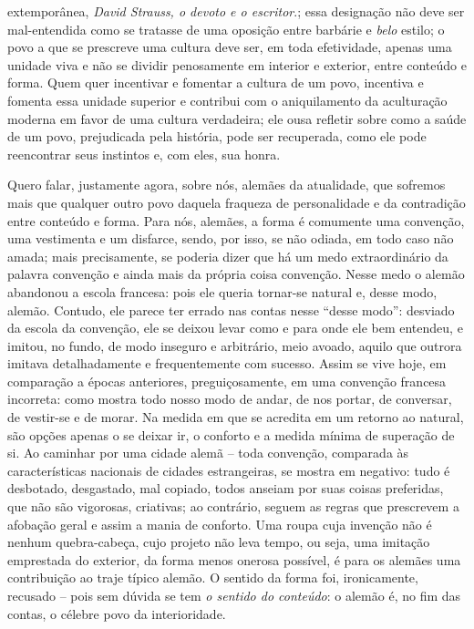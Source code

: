 \begin{enumerate}
{      extemporânea, \emph{David Strauss, o devoto e o escritor}.}; essa
    designação não deve ser mal-entendida como se tratasse de uma
    oposição entre barbárie e \emph{belo} estilo; o povo a que se
    prescreve uma cultura deve ser, em toda efetividade, apenas uma
    unidade viva e não se dividir penosamente em interior e exterior,
    entre conteúdo e forma. Quem quer incentivar e fomentar a cultura de
    um povo, incentiva e fomenta essa unidade superior e contribui com o
    aniquilamento da aculturação moderna em favor de uma cultura
    verdadeira; ele ousa refletir sobre como a saúde de um povo,
    prejudicada pela história, pode ser recuperada, como ele pode
    reencontrar seus instintos e, com eles, sua honra.

    Quero falar, justamente agora, sobre nós, alemães da atualidade, que
    sofremos mais que qualquer outro povo daquela fraqueza de
    personalidade e da contradição entre conteúdo e forma. Para nós,
    alemães, a forma é comumente uma convenção, uma vestimenta e um
    disfarce, sendo, por isso, se não odiada, em todo caso não amada;
    mais precisamente, se poderia dizer que há um medo extraordinário da
    palavra convenção e ainda mais da própria coisa convenção. Nesse
    medo o alemão abandonou a escola francesa: pois ele queria tornar-se
    natural e, desse modo, alemão. Contudo, ele parece ter errado nas
    contas nesse ``desse modo'': desviado da escola da convenção, ele se
    deixou levar como e para onde ele bem entendeu, e imitou, no fundo,
    de modo inseguro e arbitrário, meio avoado, aquilo que outrora
    imitava detalhadamente e frequentemente com sucesso. Assim se vive
    hoje, em comparação a épocas anteriores, preguiçosamente, em uma
    convenção francesa incorreta: como mostra todo nosso modo de andar,
    de nos portar, de conversar, de vestir-se e de morar. Na medida em
    que se acredita em um retorno ao natural, são opções apenas o se
    deixar ir, o conforto e a medida mínima de superação de si. Ao
    caminhar por uma cidade alemã -- toda convenção, comparada às
    características nacionais de cidades estrangeiras, se mostra em
    negativo: tudo é desbotado, desgastado, mal copiado, todos anseiam
    por suas coisas preferidas, que não são vigorosas, criativas; ao
    contrário, seguem as regras que prescrevem a afobação geral e assim
    a mania de conforto. Uma roupa cuja invenção não é nenhum
    quebra-cabeça, cujo projeto não leva tempo, ou seja, uma imitação
    emprestada do exterior, da forma menos onerosa possível, é para os
    alemães uma contribuição ao traje típico alemão. O sentido da forma
    foi, ironicamente, recusado -- pois sem dúvida se tem \emph{o
    sentido do conteúdo}: o alemão é, no fim das contas, o célebre povo
    da interioridade.


\end{enumerate}
